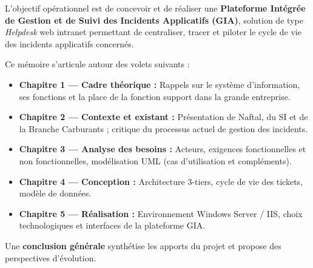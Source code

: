 L'objectif opérationnel est de concevoir et de réaliser une \textbf{Plateforme Intégrée de Gestion
et de Suivi des Incidents Applicatifs (GIA)}, solution de type \textit{Helpdesk} web intranet
permettant de centraliser, tracer et piloter le cycle de vie des incidents applicatifs concernés.

Ce mémoire s'articule autour des volets suivants :
\begin{itemize}
    \item \textbf{Chapitre 1 — Cadre théorique :} Rappels sur le système d'information,
    ses fonctions et la place de la fonction support dans la grande entreprise.
    \item \textbf{Chapitre 2 — Contexte et existant :} Présentation de Naftal, du SI et
    de la Branche Carburants ; critique du processus actuel de gestion des incidents.
    \item \textbf{Chapitre 3 — Analyse des besoins :} Acteurs, exigences fonctionnelles et
    non fonctionnelles, modélisation UML (cas d'utilisation et compléments).
    \item \textbf{Chapitre 4 — Conception :} Architecture 3-tiers, cycle de vie des tickets,
    modèle de données.
    \item \textbf{Chapitre 5 — Réalisation :} Environnement Windows Server / IIS, choix
    technologiques et interfaces de la plateforme GIA.
\end{itemize}
Une \textbf{conclusion générale} synthétise les apports du projet et propose des perspectives
d'évolution.
